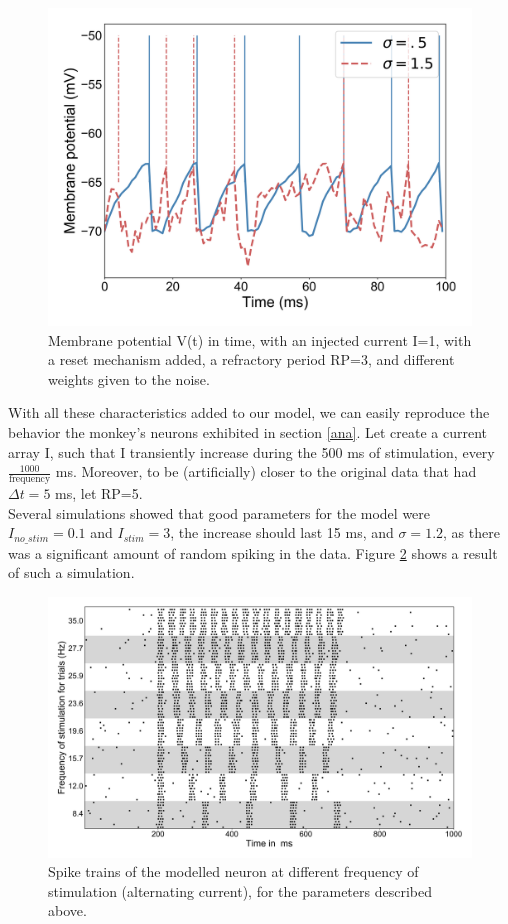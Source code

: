 \documentclass{article}
\begin{document}
\begin{figure}[H]
\centering
\includegraphics[width=0.8\linewidth]{report3_fig12.png}
\caption[growing population]{Membrane potential V(t) in time, with an injected current I=1, with a reset mechanism added, a refractory period RP=3, and different weights given to the noise.}\label{fig:fig9}
\end{figure}

With all these characteristics added to our model, we can easily reproduce the behavior the monkey's neurons exhibited in section \ref{ana}. Let create a current array I, such that I transiently increase during the 500 ms of stimulation, every $\frac{1000}{\text{frequency}}$ ms. Moreover, to be (artificially) closer to the original data that had $\Delta t = 5$ ms, let RP=5.\\
Several simulations showed that good parameters for the model were $I_{no\_stim} = 0.1$ and $I_{stim}=3$, the increase should last 15 ms, and $\sigma=1.2$, as there was a significant amount of random spiking in the data. Figure \ref{fig:fig10} shows a result of such a simulation.

\begin{figure}[H]
\centering
\includegraphics[width=1.1\linewidth]{report3_fig13.png}
\caption[growing population]{Spike trains of the modelled neuron at different frequency of stimulation (alternating current), for the parameters described above.}\label{fig:fig10}
\end{figure}
\end{document}
